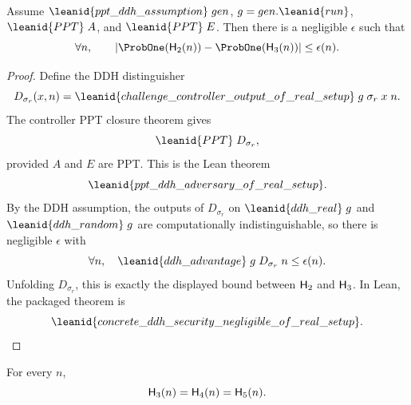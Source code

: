 \begin{lemma}
Assume \(\leanid{ppt\_ddh\_assumption}\;gen\), \(g=gen.\leanid{run}\),
\(\leanid{PPT}\;A\), and \(\leanid{PPT}\;E\).  Then there is a negligible
\(\epsilon\) such that
\[
  \forall n,\qquad
  \left|
    \ProbOne(\Hyb_2(n))-\ProbOne(\Hyb_3(n))
  \right|
  \le \epsilon(n).
\]
\end{lemma}

\begin{proof}
Define the DDH distinguisher
\[
  D_{\sigma_r}(x,n)
  =
  \leanid{challenge\_controller\_output\_of\_real\_setup}\;
    g\;\sigma_r\;x\;n .
\]
The controller PPT closure theorem gives
\[
  \leanid{PPT}\;D_{\sigma_r},
\]
provided \(A\) and \(E\) are PPT.  This is the Lean theorem
\[
  \leanid{ppt\_ddh\_adversary\_of\_real\_setup}.
\]
By the DDH assumption, the outputs of \(D_{\sigma_r}\) on
\(\leanid{ddh\_real}\;g\) and \(\leanid{ddh\_random}\;g\) are
computationally indistinguishable, so there is negligible \(\epsilon\) with
\[
  \forall n,\quad
  \leanid{ddh\_advantage}\;g\;D_{\sigma_r}\;n\le \epsilon(n).
\]
Unfolding \(D_{\sigma_r}\), this is exactly the displayed bound between
\(\mathsf{H}_2\) and \(\mathsf{H}_3\).  In Lean, the packaged theorem is
\[
  \leanid{concrete\_ddh\_security\_negligible\_of\_real\_setup}.
\]
\end{proof}

\begin{lemma}
For every \(n\),
\[
  \mathsf{H}_3(n)=\mathsf{H}_4(n)=\mathsf{H}_5(n).
\]
\end{lemma}

